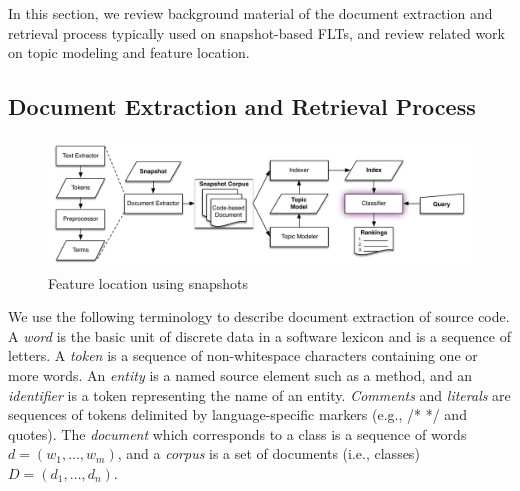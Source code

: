 

In this section, we review background material of the document extraction and retrieval process
typically used on snapshot-based FLTs,
and review related work on topic modeling and feature location.

\subsection{Document Extraction and Retrieval Process}

\begin{figure}[t]
\centerline{\includegraphics[width=.9\textwidth]{figures/snapshot-flt}}
\caption{Feature location using snapshots}
\label{fig:snapshot}
\end{figure}

We use the following terminology to describe document extraction of source code.
A \textit{word} is the basic unit of discrete data in a software lexicon and is a sequence of letters.
A \textit{token} is a sequence of non-whitespace characters containing one or more words.
An \textit{entity} is a named source element such as a method,
and an \textit{identifier} is a token representing the name of an entity.
\textit{Comments} and \textit{literals} are sequences of tokens delimited by language-specific markers (e.g., /* */ and quotes).
The \textit{document} which corresponds to a class is a sequence of words $d = (w_1, \ldots, w_m)$,
and a \textit{corpus} is a set of documents (i.e., classes) $D = (d_1, \ldots, d_n)$.

